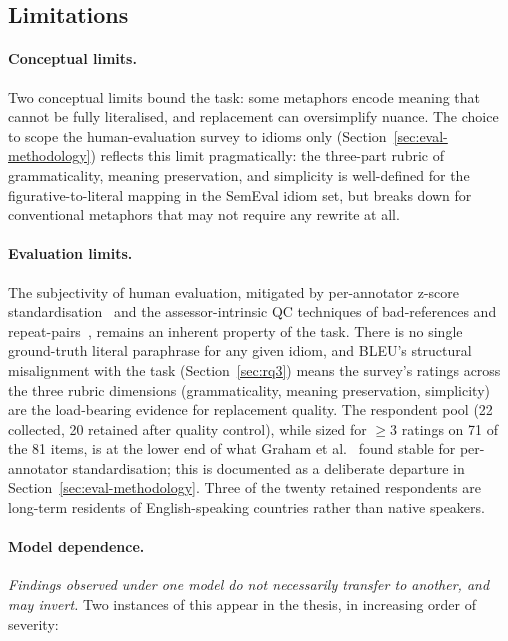 \subsection{Limitations}

\paragraph{Conceptual limits.} Two conceptual limits bound the task: some metaphors encode meaning that cannot be fully literalised, and replacement can oversimplify nuance. The choice to scope the human-evaluation survey to idioms only (Section~\ref{sec:eval-methodology}) reflects this limit pragmatically: the three-part rubric of grammaticality, meaning preservation, and simplicity is well-defined for the figurative-to-literal mapping in the SemEval idiom set, but breaks down for conventional metaphors that may not require any rewrite at all.

\paragraph{Evaluation limits.} The subjectivity of human evaluation, mitigated by per-annotator z-score standardisation~\cite{Graham2013} and the assessor-intrinsic QC techniques of bad-references and repeat-pairs~\cite{Graham2017}, remains an inherent property of the task. There is no single ground-truth literal paraphrase for any given idiom, and BLEU's structural misalignment with the task (Section~\ref{sec:rq3}) means the survey's ratings across the three rubric dimensions (grammaticality, meaning preservation, simplicity) are the load-bearing evidence for replacement quality. The respondent pool (22 collected, 20 retained after quality control), while sized for $\geq 3$ ratings on 71 of the 81 items, is at the lower end of what Graham et al.\ \cite{Graham2013} found stable for per-annotator standardisation; this is documented as a deliberate departure in Section~\ref{sec:eval-methodology}. Three of the twenty retained respondents are long-term residents of English-speaking countries rather than native speakers.

\paragraph{Model dependence.} \emph{Findings observed under one model do not necessarily transfer to another, and may invert.} Two instances of this appear in the thesis, in increasing order of severity:


